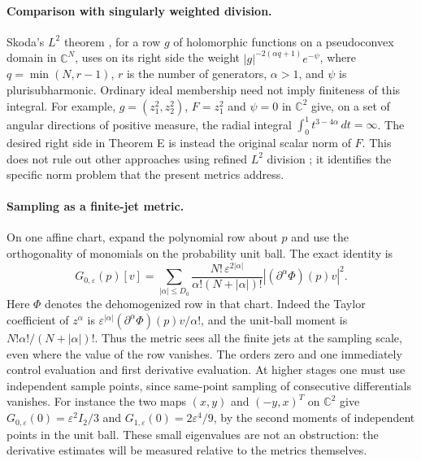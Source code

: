 \documentclass[11pt,reqno]{amsart}
\numberwithin{equation}{section}
\theoremstyle{definition}
\theoremstyle{remark}
\newcommand{\C}{\mathbb C}
\begin{document}
\paragraph{Comparison with singularly weighted division.}
Skoda's $L^2$ theorem \cite[Theorem~1]{SkodaDivision}, for a row $g$ of
holomorphic functions on a pseudoconvex domain in $\C^N$, uses on its
right side the weight $|g|^{-2(\alpha q+1)}e^{-\psi}$, where
$q=\min(N,r-1)$, $r$ is the number of generators, $\alpha>1$, and $\psi$
is plurisubharmonic. Ordinary ideal membership need not imply finiteness
of this integral. For example, $g=(z_1^2,z_2^2)$, $F=z_1^2$ and $\psi=0$
in $\C^2$ give, on a set of angular directions of positive measure, the
radial integral $\int_0^1 t^{3-4\alpha}\,dt=\infty$. The desired
right side in Theorem E is instead the original scalar norm of $F$.
This does not rule out other approaches using refined $L^2$ division
\cite{SkodaBundles,Varolin,Ji}; it identifies the specific norm problem
that the present metrics address.

\paragraph{Sampling as a finite-jet metric.}
On one affine chart, expand the polynomial row about $p$ and use the
orthogonality of monomials on the probability unit ball. The exact identity
is
\begin{equation}\label{eq:sampled-jets}
 G_{0,\varepsilon}(p)[v]=
 \sum_{|\alpha|\le D_0}
 \frac{N!\,\varepsilon^{2|\alpha|}}{\alpha!(N+|\alpha|)!}
 |(\partial^\alpha\Phi)(p)v|^2.
\end{equation}
Here $\Phi$ denotes the dehomogenized row in that chart. Indeed the
Taylor coefficient of $z^\alpha$ is $\varepsilon^{|\alpha|}
(\partial^\alpha\Phi)(p)v/\alpha!$, and the unit-ball moment is
$N!\alpha!/(N+|\alpha|)!$. Thus the metric sees all the finite jets at
the sampling scale, even where the value of the row vanishes. The
orders zero and one immediately control evaluation and first derivative
evaluation. At higher stages one must use independent sample points,
since same-point sampling of consecutive differentials vanishes.
For instance the two maps $(x,y)$ and $(-y,x)^T$ on $\C^2$ give
$G_{0,\varepsilon}(0)=\varepsilon^2 I_2/3$ and
$G_{1,\varepsilon}(0)=2\varepsilon^4/9$, by the second moments
of independent points in the unit ball. These small eigenvalues are
not an obstruction: the derivative estimates will be measured relative
to the metrics themselves.
\end{document}
